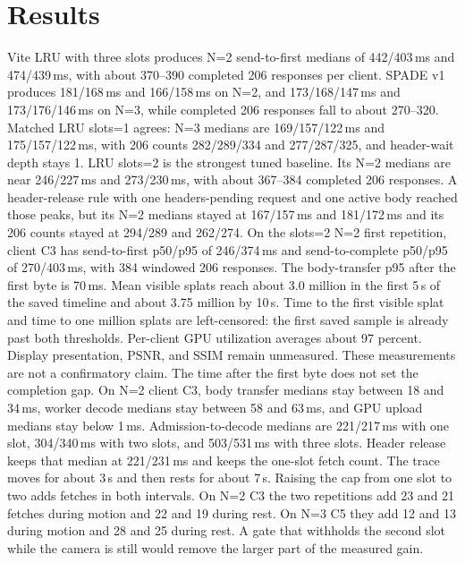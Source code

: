 \documentclass[sigconf,anonymous,review]{acmart}
\begin{document}
\section{Results}
Vite LRU with three slots produces N=2 send-to-first medians of 442/403\,ms and 474/439\,ms, with about 370--390 completed 206 responses per client. SPADE v1 produces 181/168\,ms and 166/158\,ms on N=2, and 173/168/147\,ms and 173/176/146\,ms on N=3, while completed 206 responses fall to about 270--320. Matched LRU slots=1 agrees: N=3 medians are 169/157/122\,ms and 175/157/122\,ms, with 206 counts 282/289/334 and 277/287/325, and header-wait depth stays 1. LRU slots=2 is the strongest tuned baseline. Its N=2 medians are near 246/227\,ms and 273/230\,ms, with about 367--384 completed 206 responses.
A header-release rule with one headers-pending request and one active body reached those peaks, but its N=2 medians stayed at 167/157\,ms and 181/172\,ms and its 206 counts stayed at 294/289 and 262/274. On the slots=2 N=2 first repetition, client C3 has send-to-first p50/p95 of 246/374\,ms and send-to-complete p50/p95 of 270/403\,ms, with 384 windowed 206 responses. The body-transfer p95 after the first byte is 70\,ms. Mean visible splats reach about 3.0 million in the first 5\,s of the saved timeline and about 3.75 million by 10\,s. Time to the first visible splat and time to one million splats are left-censored: the first saved sample is already past both thresholds. Per-client GPU utilization averages about 97 percent. Display presentation, PSNR, and SSIM remain unmeasured. These measurements are not a confirmatory claim.
The time after the first byte does not set the completion gap. On N=2 client C3, body transfer medians stay between 18 and 34\,ms, worker decode medians stay between 58 and 63\,ms, and GPU upload medians stay below 1\,ms. Admission-to-decode medians are 221/217\,ms with one slot, 304/340\,ms with two slots, and 503/531\,ms with three slots. Header release keeps that median at 221/231\,ms and keeps the one-slot fetch count. The trace moves for about 3\,s and then rests for about 7\,s. Raising the cap from one slot to two adds fetches in both intervals. On N=2 C3 the two repetitions add 23 and 21 fetches during motion and 22 and 19 during rest. On N=3 C5 they add 12 and 13 during motion and 28 and 25 during rest. A gate that withholds the second slot while the camera is still would remove the larger part of the measured gain.
\end{document}
